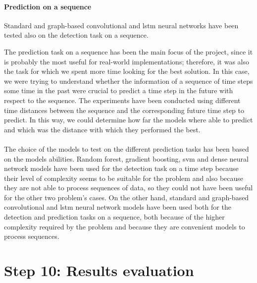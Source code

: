 \paragraph{Prediction on a sequence} Standard and graph-based convolutional and \acs{lstm} neural networks have been tested also on the detection task on a sequence.

The prediction task on a sequence has been the main focus of the project, since it is probably the most useful for real-world implementations; therefore, it was also the task for which we spent more time looking for the best solution. In this case, we were trying to understand whether the information of a sequence of time steps some time in the past were crucial to predict a time step in the future with respect to the sequence. The experiments have been conducted using different time distances between the sequence and the corresponding future time step to predict. In this way, we could determine how far the models where able to predict and which was the distance with which they performed the best.

\paragraph{} The choice of the models to test on the different prediction tasks has been based on the models abilities. Random forest, gradient boosting, \acs{svm} and dense neural network models have been used for the detection task on a time step because their level of complexity seems to be suitable for the problem and also because they are not able to process sequences of data, so they could not have been useful for the other two problem's cases. On the other hand, standard and graph-based convolutional and \acs{lstm} neural network models have been used both for the detection and prediction tasks on a sequence, both because of the higher complexity required by the problem and because they are convenient models to process sequences.


\section{Step 10: Results evaluation} \label{sec: step_restults_evaluation}
